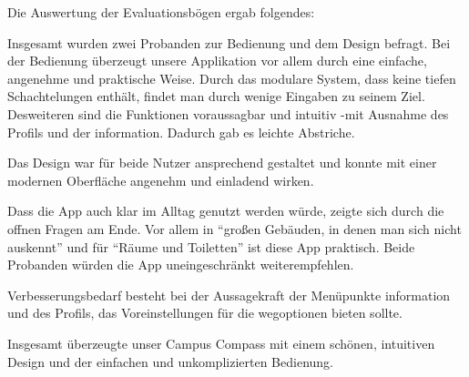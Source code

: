 Die Auswertung der Evaluationsbögen ergab folgendes:

Insgesamt wurden zwei Probanden zur Bedienung und dem Design befragt. 
Bei der Bedienung überzeugt unsere Applikation vor allem durch eine einfache, angenehme und praktische Weise. Durch das modulare System, dass keine tiefen Schachtelungen enthält, findet man durch wenige Eingaben zu seinem Ziel.
Desweiteren sind die Funktionen voraussagbar und intuitiv -mit Ausnahme des Profils und der \gls{information}. Dadurch gab es leichte Abstriche.

Das Design war für beide Nutzer ansprechend gestaltet und konnte mit einer modernen Oberfläche angenehm und einladend wirken.

Dass die App auch klar im Alltag genutzt werden würde, zeigte sich durch die offnen Fragen am Ende. Vor allem in “großen Gebäuden, in denen man sich nicht auskennt” und für “Räume und Toiletten” ist diese App praktisch.
Beide Probanden würden die App uneingeschränkt weiterempfehlen.

Verbesserungsbedarf besteht bei der Aussagekraft der Menüpunkte \gls{information} und des Profils, das Voreinstellungen für die \gls{weg}optionen bieten sollte.

Insgesamt überzeugte unser Campus Compass mit einem schönen, intuitiven Design und der einfachen und unkomplizierten Bedienung.